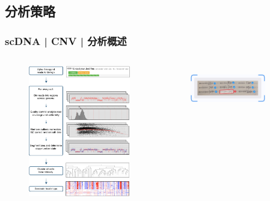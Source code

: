 \documentclass[11pt]{ctexbeamer}
\begin{document}
\subsection{分析策略}
\begin{frame}
  \frametitle{scDNA | CNV | 分析概述}
  \begin{columns}
  \begin{figure}
    \centering
    \includegraphics[width=\textwidth]{scDNA_CNA_workflow_02.png}
  \end{figure}
  \begin{figure}
    \centering
    \includegraphics[width=0.8\textwidth]{scDNA_OCR_01.png}\\

\end{figure}
\end{columns}
\end{frame}
\end{document}
